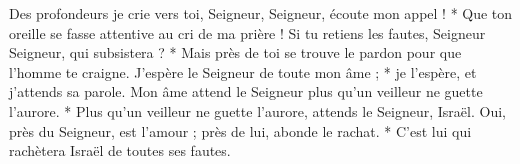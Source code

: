 Des profondeurs je crie vers toi, Seigneur,
\versseparator
Seigneur, écoute mon appel ! * Que ton oreille se fasse attentive au cri de ma prière !
\versseparator
Si tu retiens les fautes, Seigneur Seigneur, qui subsistera ? *
\versseparator
Mais près de toi se trouve le pardon pour que l'homme te craigne.
\versseparator
J'espère le Seigneur de toute mon âme ; * je l'espère, et j'attends sa parole.
\versseparator
Mon âme attend le Seigneur plus qu'un veilleur ne guette l'aurore. * Plus qu'un veilleur ne guette l'aurore,
\versseparator
attends le Seigneur, Israël. Oui, près du Seigneur, est l'amour ; près de lui, abonde le rachat. *
\versseparator
C'est lui qui rachètera Israël de toutes ses fautes.
